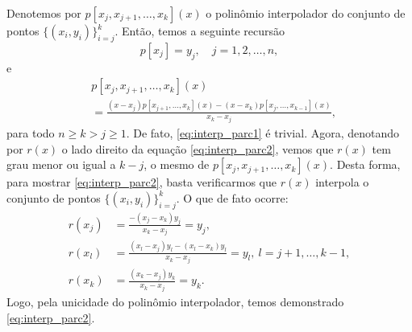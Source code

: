 Denotemos por $p[x_j, x_{j+1}, \dotsc, x_{k}](x)$ o polinômio interpolador do conjunto de pontos $\{(x_i, y_i)\}_{i=j}^k$. Então, temos a seguinte recursão
\begin{equation} \label{eq:interp_parc1}
  p[x_j] = y_j,\quad j=1, 2, \dotsc, n,
\end{equation}
e
\begin{align}
  &p[x_j, x_{j+1}, \ldots, x_k](x) \nonumber\\
  &= \frac{(x-x_j)p[x_{j+1},\dotsc,x_k](x)-(x-x_k)p[x_j,\dotsc,x_{k-1}](x)}{x_k-x_j},\label{eq:interp_parc2}
\end{align}
para todo $n\geq k > j \geq 1$. De fato, \eqref{eq:interp_parc1} é trivial. Agora, denotando por $r(x)$ o lado direito da equação \eqref{eq:interp_parc2}, vemos que $r(x)$ tem grau menor ou igual a $k-j$, o mesmo de $p[x_j, x_{j+1}, \ldots, x_k](x)$. Desta forma, para mostrar \eqref{eq:interp_parc2}, basta verificarmos que $r(x)$ interpola o conjunto de pontos $\{(x_i, y_i)\}_{i=j}^k$. O que de fato ocorre:
\begin{align}
  r(x_j) &= \frac{-(x_j-x_k)y_j}{x_k-x_j} = y_j,\\
  r(x_{l}) &= \frac{(x_l-x_j)y_l-(x_l-x_k)y_l}{x_k-x_j}=y_l,~l=j+1,\dotsc,k-1,\\
  r(x_k) &= \frac{(x_k-x_j)y_k}{x_k-x_j}=y_k.
\end{align}
Logo, pela unicidade do polinômio interpolador, temos demonstrado \eqref{eq:interp_parc2}.

